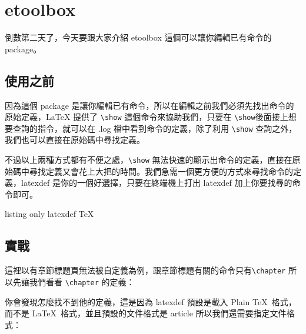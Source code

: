 \chapter{etoolbox}

倒數第二天了，今天要跟大家介紹 etoolbox 這個可以讓你編輯已有命令的 package。

\section{使用之前}

因為這個 package 是讓你編輯已有命令，所以在編輯之前我們必須先找出命令的原始定義，LaTeX 提供了 \verb`\show` 這個命令來協助我們，只要在 \verb`\show`後面接上想要查詢的指令，就可以在 .log 檔中看到命令的定義，除了利用 \verb`\show` 查詢之外，我們也可以直接在原始碼中尋找定義。

不過以上兩種方式都有不便之處，\verb`\show` 無法快速的顯示出命令的定義，直接在原始碼中尋找定義又會花上大把的時間。我們急需一個更方便的方式來尋找命令的定義，latexdef 是你的一個好選擇，只要在終端機上打出 latexdef 加上你要找尋的命令即可。

\begin{tcblisting}{listing only}
latexdef TeX
\end{tcblisting}

\section{實戰}

這裡以有章節標題頁無法被自定義為例，跟章節標題有關的命令只有\verb`\chapter` 所以先讓我們看看 \verb`\chapter` 的定義：


你會發現怎麼找不到他的定義，這是因為 latexdef 預設是載入 Plain \TeX\ 格式，而不是 \LaTeX\ 格式，並且預設的文件格式是 article 所以我們還需要指定文件格式：


